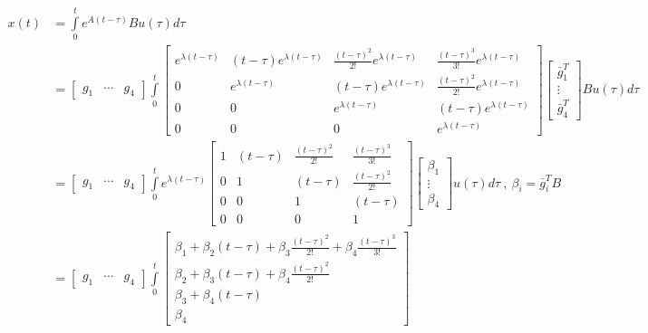 \documentclass[twoside]{article}
\begin{document}
\begin{align*}
    x(t) &= \int\limits_{0}^{t} e^{A ( t - \tau ) } B u(\tau) d \tau 
    \\[1ex]
    &= \begin{bmatrix} g_1 & \cdots & g_4 \end{bmatrix} \int\limits_{0}^{t} 
\begin{bmatrix} e^{\lambda (t - \tau)} & (t-\tau) e^{\lambda (t-\tau)} & \frac{(t-\tau)^2}{2 !} e^{\lambda (t-\tau)} & \frac{(t-\tau)^3}{3 !} e^{\lambda (t-\tau)}
\\ 0 & e^{\lambda (t-\tau)} & (t-\tau) e^{\lambda (t-\tau)} & \frac{(t-\tau)^2}{2 !} e^{\lambda (t-\tau)} \\ 0 & 0 & e^{\lambda (t-\tau)} & (t-\tau) e^{\lambda (t-\tau)} \\ 0 & 0 & 0 & e^{\lambda (t-\tau)} \end{bmatrix} 
%
    \begin{bmatrix} \bar{g}_1^T \\ \vdots \\ \bar{g}_4^T \end{bmatrix}  B u(\tau) d \tau
\\[1ex]
&= \begin{bmatrix} g_1 & \cdots & g_4 \end{bmatrix} \int\limits_{0}^{t} 
e^{\lambda (t - \tau)} \begin{bmatrix} 1 & (t-\tau)  & \frac{(t-\tau)^2}{2 !}  & \frac{(t-\tau)^3}{3 !} 
\\ 0 & 1 & (t-\tau)  & \frac{(t-\tau)^2}{2 !}  \\ 0 & 0 & 1 & (t-\tau)  \\ 0 & 0 & 0 & 1 \end{bmatrix} 
%
    \begin{bmatrix} \beta_1 \\ \vdots \\ \beta_4 \end{bmatrix} u(\tau) d \tau \ , \ \beta_i = \bar{g}_i^T B
\\[1ex]
&= \begin{bmatrix} g_1 & \cdots & g_4 \end{bmatrix} \int\limits_{0}^{t} 
\begin{bmatrix} \beta_1 + \beta_2 (t-\tau) +  \beta_3 \frac{(t-\tau)^2}{2 !} + \beta_4 \frac{(t-\tau)^3}{3 !} 
\\  \beta_2 + \beta_3 (t-\tau)  + \beta_4 \frac{(t-\tau)^2}{2 !}  \\ \beta_3 + \beta_4 (t-\tau)  \\ \beta_4  \end{bmatrix} 

\end{align*}
\end{document}
